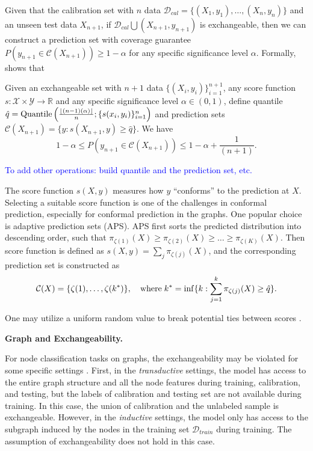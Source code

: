 Given that the calibration set with $n$ data $\mathcal{D}_{cal}=\{ (X_1, y_1), \dots, (X_n, y_n) \}$ and an unseen test data $X_{n+1}$, if $\mathcal{D}_{cal} \bigcup {(X_{n+1}, y_{n+1})}$ is exchangeable, then we can construct a prediction set with coverage guarantee $P(y_{n+1}\in \mathcal{C}(X_{n+1})) \geq 1 - \alpha$ for any specific significance level $\alpha$.
Formally, \cite{vovk2005algorithmic} shows that
\begin{theorem}
    Given an exchangeable set with $n+1$ data $\{ (X_i, y_i)\}_{i=1}^{n+1}$, 
    any score function $s: \mathcal{X}\times \mathcal{Y}\to \mathbb{R}$ and any specific significance level $\alpha \in (0, 1)$,
    define quantile $\hat{q}=\textnormal{Quantile}\left( \frac{ \lfloor (n-1)(\alpha) \rfloor }{n}; \{ s(x_i, y_i) \}_{i=1}^n \right)$ and prediction sets 
    $\mathcal{C}(X_{n+1}) = \{ y: s(X_{n+1},y) \geq \hat{q} \}$.
    We have
    \begin{equation}
        1-\alpha \leq P \left( y_{n+1} \in \mathcal{C}(X_{n+1}) \right) \leq 1- \alpha + \frac{1}{(n+1)}.
    \end{equation}
\end{theorem}
\textcolor{blue}{To add other operations: build quantile and the prediction set, etc.}

The score function $s(X, y)$ measures how $y$ ``conforms'' to the prediction at $X$.
Selecting a suitable score function is one of the challenges in conformal prediction, especially for conformal prediction in the graphs. 
% 
One popular choice is adaptive prediction sets (APS).
APS first sorts the predicted distribution into descending order, such that 
$\pi_{\zeta(1)}(X) \geq \pi_{\zeta(2)}(X) \geq \dots \geq \pi_{\zeta(K)}(X)$.
Then score function is defined as $s(X,y) = \sum_{j} \pi_{\zeta(j)}(X)$,
and the corresponding prediction set is constructed as
\begin{equation}
    \mathcal{C}(X)=\{ \zeta(1), \dots, \zeta(k^\ast) \}, \quad
    \textnormal{where} \; k^\ast=\inf\{ k: \sum_{j=1}^k \pi_{\zeta(j)}(X) \geq \hat{q} \}.
\end{equation}

% 
One may utilize a uniform random value to break potential ties between scores \cite{stutz2021learning}.


\noindent\textbf{Graph and Exchangeability.} 

For node classification tasks on graphs, 
the exchangeability may be violated for some specific settings \cite{zargarbashi2023conformal}.
First, 
in the \textit{transductive} settings, 
the model has access to the entire graph structure and all the node features during training, calibration, and testing, 
but the labels of calibration and testing set are not available during training. 
In this case, the union of calibration and the unlabeled sample is exchangeable.
However, 
in the \textit{inductive} settings, 
the model only has access to the subgraph induced by the nodes in the training set $\mathcal{D}_{train}$ during training.
The assumption of exchangeability does not hold in this case.

